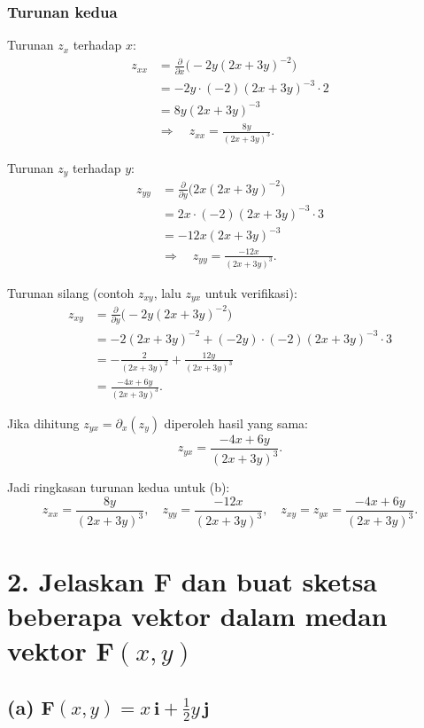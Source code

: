 \documentclass[12pt]{article}
\begin{document}
\subsubsection*{Turunan kedua}
Turunan $z_x$ terhadap $x$:
\[
\begin{aligned}
z_{xx}
&= \frac{\partial}{\partial x}\Big(-2y(2x+3y)^{-2}\Big) \\
&= -2y \cdot (-2)(2x+3y)^{-3} \cdot 2 \\
&= 8y(2x+3y)^{-3} \\
&\Rightarrow\quad z_{xx} = \frac{8y}{(2x+3y)^3}.
\end{aligned}
\]

Turunan $z_y$ terhadap $y$:
\[
\begin{aligned}
z_{yy}
&= \frac{\partial}{\partial y}\Big(2x(2x+3y)^{-2}\Big) \\
&= 2x \cdot (-2)(2x+3y)^{-3} \cdot 3 \\
&= -12x(2x+3y)^{-3} \\
&\Rightarrow\quad z_{yy} = \frac{-12x}{(2x+3y)^3}.
\end{aligned}
\]

Turunan silang (contoh $z_{xy}$, lalu $z_{yx}$ untuk verifikasi):
\[
\begin{aligned}
z_{xy}
&= \frac{\partial}{\partial y}\Big(-2y(2x+3y)^{-2}\Big) \\
&= -2(2x+3y)^{-2} + (-2y)\cdot(-2)(2x+3y)^{-3}\cdot 3 \\
&= -\frac{2}{(2x+3y)^2} + \frac{12y}{(2x+3y)^3} \\
&= \frac{-4x + 6y}{(2x+3y)^3}.
\end{aligned}
\]

Jika dihitung $z_{yx} = \partial_x(z_y)$ diperoleh hasil yang sama:
\[
z_{yx}=\frac{-4x+6y}{(2x+3y)^3}.
\]

Jadi ringkasan turunan kedua untuk (b):
\[
\boxed{z_{xx}=\dfrac{8y}{(2x+3y)^3},\quad
z_{yy}=\dfrac{-12x}{(2x+3y)^3},\quad
z_{xy}=z_{yx}=\dfrac{-4x+6y}{(2x+3y)^3}}.
\]

\section*{2. Jelaskan $\mathbf{F}$ dan buat sketsa beberapa vektor dalam medan vektor $\mathbf{F}(x,y)$}

\subsection*{(a) $\displaystyle \mathbf{F}(x,y)=x\,\mathbf{i}+\tfrac{1}{2}y\,\mathbf{j}$}
\end{document}
